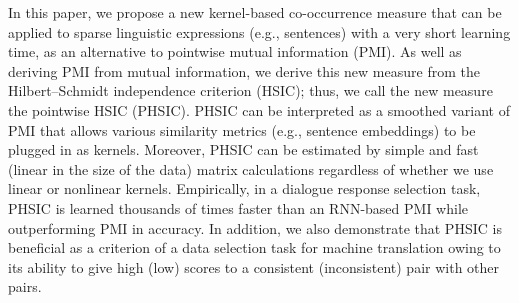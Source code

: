 In this paper, we propose a new kernel-based co-occurrence measure that can be applied to sparse linguistic expressions (e.g., sentences) with a very short learning time, as an alternative to pointwise mutual information (PMI). As well as deriving PMI from mutual information, we derive this new measure from the Hilbert--Schmidt independence criterion (HSIC); thus, we call the new measure the pointwise HSIC (PHSIC). PHSIC can be interpreted as a smoothed variant of PMI that allows various similarity metrics (e.g., sentence embeddings) to be plugged in as kernels. Moreover, PHSIC can be estimated by simple and fast (linear in the size of the data) matrix calculations regardless of whether we use linear or nonlinear kernels. Empirically, in a dialogue response selection task, PHSIC is learned thousands of times faster than an RNN-based PMI while outperforming PMI in accuracy. In addition, we also demonstrate that PHSIC is beneficial as a criterion of a data selection task for machine translation  owing to its ability to give high (low) scores to a consistent (inconsistent) pair with other pairs.
